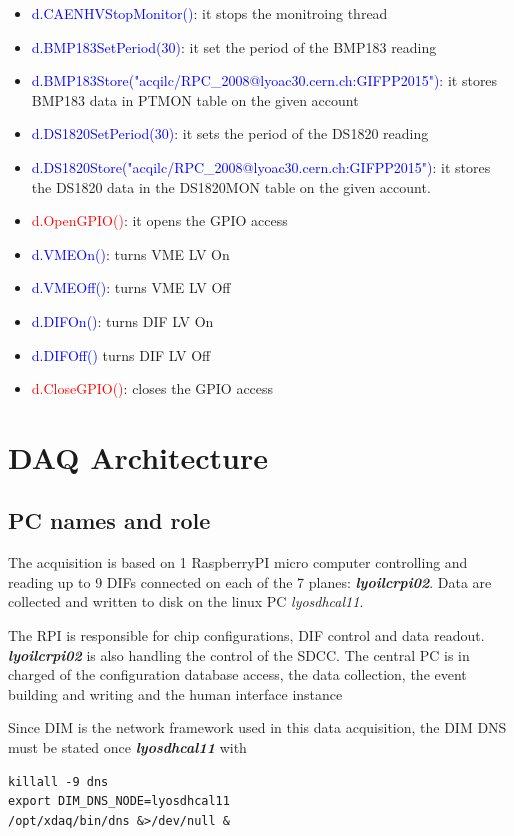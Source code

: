 \documentclass[english]{article}
\begin{document}
\begin{itemize}
\item \textcolor{blue}{d.CAENHVStopMonitor()}: it stops the monitroing thread
\item \textcolor{blue}{d.BMP183SetPeriod(30)}: it set the period of the BMP183 reading
\item \textcolor{blue}{d.BMP183Store("acqilc/RPC\_2008@lyoac30.cern.ch:GIFPP2015")}: it stores BMP183 data in PTMON table on the given account
\item \textcolor{blue}{d.DS1820SetPeriod(30)}: it sets the period of the DS1820 reading
\item \textcolor{blue}{d.DS1820Store("acqilc/RPC\_2008@lyoac30.cern.ch:GIFPP2015")}: it stores the DS1820 data in the DS1820MON table on the given account.
\item \textcolor{red}{d.OpenGPIO()}: it opens the GPIO access
\item \textcolor{blue}{d.VMEOn()}: turns VME LV On
\item \textcolor{blue}{d.VMEOff()}: turns VME LV Off
\item \textcolor{blue}{d.DIFOn()}: turns DIF LV On
\item \textcolor{blue}{d.DIFOff()} turns DIF LV Off
\item \textcolor{red}{d.CloseGPIO()}: closes the GPIO access

\end{itemize}
\section{DAQ Architecture}

\subsection{PC names and role}
The acquisition is based on 1 RaspberryPI micro computer controlling and reading up to 9 DIFs connected on each of the 7 planes: {\sl \bf lyoilcrpi02}. Data are collected and written to disk on the linux PC {\sl lyosdhcal11}.

The  RPI is responsible for chip configurations, DIF control and data readout. {\sl \bf lyoilcrpi02} is also handling the control of the SDCC. The central PC is in charged of the configuration database access, the data collection, the event building and writing and the human interface instance

Since DIM is the network framework used in this data acquisition, the DIM DNS must be stated once {\sl \bf lyosdhcal11} with
\begin{verbatim}
killall -9 dns
export DIM_DNS_NODE=lyosdhcal11
/opt/xdaq/bin/dns &>/dev/null &
\end{verbatim}
\end{document}
